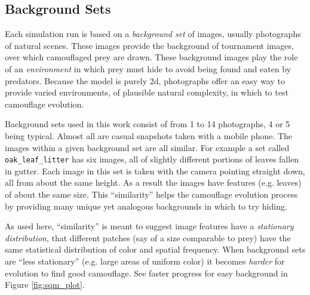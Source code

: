 \documentclass[letterpaper]{article}
\newcommand{\jargon}[1]{\textit{#1}}
\newcommand{\stt}[1]{{\small \texttt{#1}}}
\begin{document}
\subsection{Background Sets}
\label{subsec:background_sets}
Each simulation run is based on a \jargon{background set} of images, usually photographs of natural scenes. These images provide the background of tournament images, over which camouflaged prey are drawn. These background images play the role of an \jargon{environment} in which prey must hide to avoid being found and eaten by predators. Because the model is purely 2d, photographs offer an easy way to provide varied environments, of plausible natural complexity, in which to test camouflage evolution.
\par
Background sets used in this work consist of from 1 to 14 photographs, 4 or 5 being typical. Almost all are casual snapshots taken with a mobile phone. The images within a given background set are all similar. For example a set called \stt{oak\_leaf\_litter} has six images, all of slightly different portions of leaves fallen in gutter. Each image in this set is taken with the camera pointing straight down, all from about the same height. As a result the images have features (e.g. leaves) of about the same size. This “similarity” helps the camouflage evolution process by providing many unique yet analogous backgrounds in which to try hiding.
\par
As used here, “similarity” is meant to suggest image features have a \jargon{stationary distribution}, that different patches (say of a size comparable to prey) have the same statistical distribution of color and spatial frequency. When background sets are “less stationary” (e.g. large areas of uniform color) it becomes \jargon{harder} for evolution to find good camouflage. See faster progress for easy background in Figure \ref{fig:sqm_plot}.
\par

\end{document}
